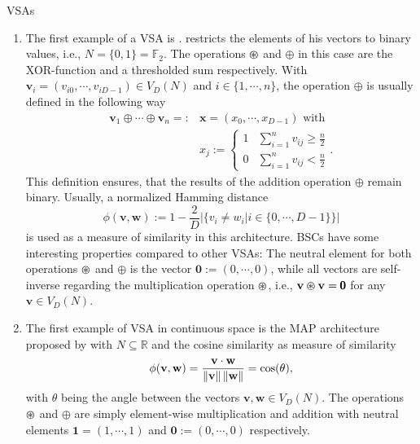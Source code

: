 \begin{ex} \aclp{VSA}
	\label{ex:VSAs}
	\begin{enumerate}
		\item The first example of a \ac{VSA} is .
            \textcite{Kanerva2009} restricts the elements of his vectors to binary values, i.e., $N=\{0,1\} = \mathbb{F}_{2}$.
		The operations $\varoast$ and $\oplus$ in this case are the XOR-function and a thresholded sum respectively.
		With $ \mathbf{v}_{i} = \left(v_{i 0}, \cdots, v_{i D-1}\right) \in V_{D}(N)$ and  $i \in \{1, \cdots, n\}$, the operation $\oplus$ is usually defined in the following way
		\begin{align*}
			\mathbf{v}_{1} \oplus \cdots \oplus \mathbf{v}_{n} =: &\mathbf{x} = \left(x_{0}, \cdots, x_{D-1}\right) \textrm{ with } \\
			&x_{j}:= \begin{cases}
				1 & \sum\limits_{i=1}^{n} v_{ij} \geq \frac{n}{2} \\
				0 & \sum\limits_{i=1}^{n} v_{ij} < \frac{n}{2}
			\end{cases}.
		\end{align*}
		This definition ensures, that the results of the addition operation $\oplus$ remain binary.
		Usually, a normalized Hamming distance
		\[
		\phi( \mathbf{v}, \mathbf{w}) := 1 - \frac{2}{D} \left| \{ v_{i} \neq w_{i} | i \in \{0, \cdots, D-1\} \} \right|
		\]
		is used as a measure of similarity in this architecture.
		\acp{BSC} have some interesting properties compared to other \acp{VSA}:
		The neutral element for both operations $\varoast$ and $\oplus$ is the vector $\pmb{0} := \left(0, \cdots, 0\right)$, while all vectors are self-inverse regarding the multiplication operation $\varoast$, i.e., $ \mathbf{v} \varoast \mathbf{v} = \pmb{0}$ for any $ \mathbf{v} \in V_{D}(N)$.

		\item The first example of \ac{VSA} in continuous space is the \acrfull{MAP} architecture proposed by \textcite{Gayler1998} with $N \subseteq \mathbb{R}$ and the cosine similarity as measure of similarity
		\[
		\phi( \mathbf{v}, \mathbf{w}) = \frac{ \mathbf{v} \cdot \mathbf{w}}{\left\|  \mathbf{v} \right\|\left\|  \mathbf{w} \right\|}=\cos(\theta),
		\]
		with $\theta$ being the angle between the vectors $ \mathbf{v}, \mathbf{w} \in V_{D}(N)$.
		The operations $\varoast$ and $\oplus$ are simply element-wise multiplication and addition with neutral elements $\pmb{1}=\left(1, \cdots, 1\right)$ and $\pmb{0} := \left(0, \cdots, 0\right)$ respectively.


\end{enumerate}
\end{ex}
